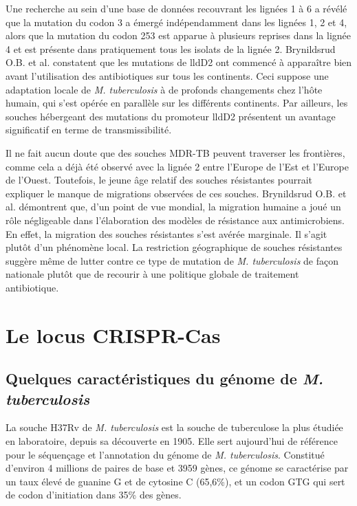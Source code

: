 \documentclass[twoside,a4paper,11pt,frenchb,openany]{report}
\begin{document}
Une recherche au sein d'une base de données recouvrant les lignées 1 à 6 a révélé que la mutation du codon 3 a émergé indépendamment dans les lignées 1, 2 et 4, alors que la mutation du codon 253 est apparue à plusieurs reprises dans la lignée 4 et est présente dans pratiquement tous les isolats de la lignée 2. Brynildsrud O.B. et al. constatent que les mutations de lldD2 ont commencé à apparaître bien avant l'utilisation des antibiotiques sur tous les continents. Ceci suppose une adaptation locale de \textit{M. tuberculosis} à de profonds changements chez l'hôte humain, qui s'est opérée en parallèle sur les différents continents. Par ailleurs, les souches hébergeant des mutations du promoteur lldD2 présentent un avantage significatif en terme de transmissibilité.

Il ne fait aucun doute que des souches MDR-TB peuvent traverser les frontières, comme cela a déjà été observé avec la lignée 2 entre l'Europe de l'Est et l'Europe de l'Ouest. Toutefois, le jeune âge relatif des souches résistantes pourrait expliquer le manque de migrations observées de ces souches. Brynildsrud O.B. et al. démontrent que, d'un point de vue mondial, la migration humaine a joué un rôle négligeable dans l'élaboration des modèles de résistance aux antimicrobiens. En effet, la migration des souches résistantes s'est avérée marginale. Il s'agit plutôt d'un phénomène local. La restriction géographique de souches résistantes suggère même de lutter contre ce type de mutation de \textit{M. tuberculosis} de façon nationale plutôt que de recourir à une politique globale de traitement antibiotique.


\section{Le locus CRISPR-Cas}

\subsection{Quelques caractéristiques du génome de \textit{M. tuberculosis}}

La souche H37Rv de \textit{M. tuberculosis} est la souche de tuberculose la plus étudiée en laboratoire, depuis sa découverte en 1905. Elle sert aujourd'hui de référence pour le séquençage et l'annotation du génome de \textit{M. tuberculosis}. Constitué d'environ 4 millions de paires de base et 3959 gènes, ce génome se caractérise par un taux élevé de guanine G et de cytosine C (65,6\%), et un codon GTG qui sert de codon d'initiation dans 35\% des gènes. 
\end{document}
